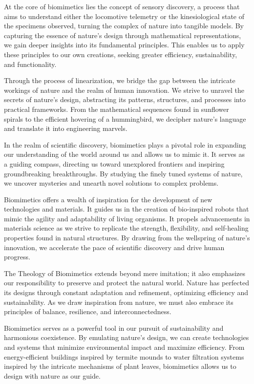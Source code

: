 \documentclass[ebook,12pt,oneside,openany]{memoir}
\begin{document}
\indent At the core of biomimetics lies the concept of sensory discovery, a process that aims to understand either the locomotive telemetry or the kinesiological state of the specimens observed, turning the complex of nature into tangible models. By capturing the essence of nature's design through mathematical representations, we gain deeper insights into its fundamental principles. This enables us to apply these principles to our own creations, seeking greater efficiency, sustainability, and functionality.

\indent Through the process of linearization, we bridge the gap between the intricate workings of nature and the realm of human innovation. We strive to unravel the secrets of nature's design, abstracting its patterns, structures, and processes into practical frameworks. From the mathematical sequences found in sunflower spirals to the efficient hovering of a hummingbird, we decipher nature's language and translate it into engineering marvels.

\indent In the realm of scientific discovery, biomimetics plays a pivotal role in expanding our understanding of the world around us and allows us to mimic it. It serves as a guiding compass, directing us toward unexplored frontiers and inspiring groundbreaking breakthroughs. By studying the finely tuned systems of nature, we uncover mysteries and unearth novel solutions to complex problems.

\indent Biomimetics offers a wealth of inspiration for the development of new technologies and materials. It guides us in the creation of bio-inspired robots that mimic the agility and adaptability of living organisms. It propels advancements in materials science as we strive to replicate the strength, flexibility, and self-healing properties found in natural structures. By drawing from the wellspring of nature's innovation, we accelerate the pace of scientific discovery and drive human progress.

\indent The Theology of Biomimetics extends beyond mere imitation; it also emphasizes our responsibility to preserve and protect the natural world. Nature has perfected its designs through constant adaptation and refinement, optimizing efficiency and sustainability. As we draw inspiration from nature, we must also embrace its principles of balance, resilience, and interconnectedness.

\indent Biomimetics serves as a powerful tool in our pursuit of sustainability and harmonious coexistence. By emulating nature's design, we can create technologies and systems that minimize environmental impact and maximize efficiency. From energy-efficient buildings inspired by termite mounds to water filtration systems inspired by the intricate mechanisms of plant leaves, biomimetics allows us to design with nature as our guide.
\end{document}
